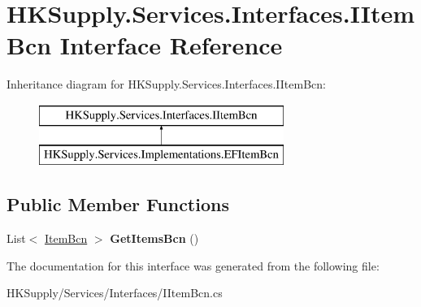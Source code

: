 \hypertarget{interface_h_k_supply_1_1_services_1_1_interfaces_1_1_i_item_bcn}{}\section{H\+K\+Supply.\+Services.\+Interfaces.\+I\+Item\+Bcn Interface Reference}
\label{interface_h_k_supply_1_1_services_1_1_interfaces_1_1_i_item_bcn}
Inheritance diagram for H\+K\+Supply.\+Services.\+Interfaces.\+I\+Item\+Bcn\+:\begin{figure}[H]
\begin{center}
\leavevmode
\includegraphics[height=2.000000cm]{interface_h_k_supply_1_1_services_1_1_interfaces_1_1_i_item_bcn}
\end{center}
\end{figure}
\subsection*{Public Member Functions}
\begin{DoxyCompactItemize}
\item 
\mbox{\label{interface_h_k_supply_1_1_services_1_1_interfaces_1_1_i_item_bcn_adf6c08f67bebc21df6305faa151d298d}} 
List$<$ \mbox{\hyperlink{class_h_k_supply_1_1_models_1_1_item_bcn}{Item\+Bcn}} $>$ {\bfseries Get\+Items\+Bcn} ()
\end{DoxyCompactItemize}


The documentation for this interface was generated from the following file\+:\begin{DoxyCompactItemize}
\item 
H\+K\+Supply/\+Services/\+Interfaces/I\+Item\+Bcn.\+cs\end{DoxyCompactItemize}
